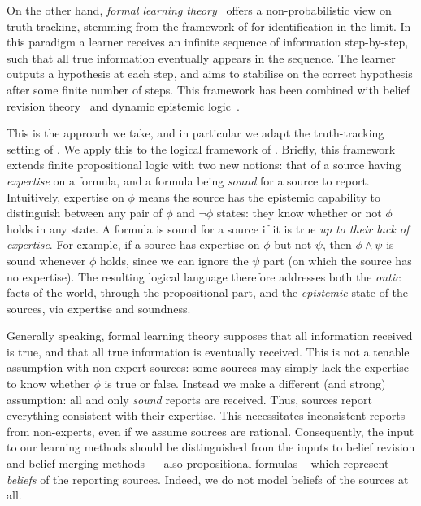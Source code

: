 On the other hand, \emph{formal learning theory}~\cite{jain1999systems} offers
a non-probabilistic view on truth-tracking, stemming from the framework of
\textcite{Gold_1967} for identification in the limit. In this paradigm a learner
receives an infinite sequence of information step-by-step, such that all true
information eventually appears in the sequence. The learner outputs a
hypothesis at each step, and aims to stabilise on the correct hypothesis after
some finite number of steps. This framework has been combined with belief
revision theory~\cite{kelly1997reliable,baltag_tt_2019} and dynamic
epistemic logic~\cite{baltag2019dynamic}.

This is the approach we take, and in particular we adapt the truth-tracking
setting of \textcite{baltag_tt_2019}. We apply this to the logical
framework of \textcite{singleton_booth_22_preprint}. Briefly, this framework
extends finite propositional logic with two new notions: that of a source
having \emph{expertise} on a formula, and a formula being \emph{sound} for a
source to report. Intuitively, expertise on $\phi$ means the source has the
epistemic capability to distinguish between any pair of $\phi$ and $\neg\phi$
states: they know whether or not $\phi$ holds in any state. A formula is sound
for a source if it is true \emph{up to their lack of expertise}. For example,
if a source has expertise on $\phi$ but not $\psi$, then $\phi \land \psi$ is
sound whenever $\phi$ holds, since we can ignore the $\psi$ part (on which the
source has no expertise). The resulting logical language therefore addresses
both the \emph{ontic} facts of the world, through the propositional part, and
the \emph{epistemic} state of the sources, via expertise and soundness.

Generally speaking, formal learning theory supposes that all information
received is true, and that all true information is eventually
received.\footnotemark{} This is not a tenable assumption with non-expert
sources: some sources may simply lack the expertise to know whether $\phi$ is
true or false. Instead we make a different (and strong) assumption: all and
only \emph{sound} reports are received. Thus, sources report everything
consistent with their expertise. This necessitates inconsistent reports from
non-experts, even if we assume sources are rational. Consequently, the input to
our learning methods should be distinguished from the inputs to belief revision
and belief merging methods~\cite{alchourron1985logic,konieczny2002merging} --
also propositional formulas -- which represent \emph{beliefs} of the reporting
sources. Indeed, we do not model beliefs of the sources at all.

